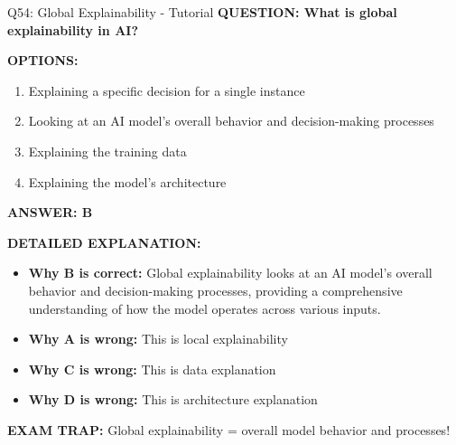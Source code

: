 \documentclass[8pt]{beamer}
\begin{document}
	\begin{frame}{Q54: Global Explainability - Tutorial}
		\fontsize{6.5}{7.5}\selectfont
		\textbf{QUESTION: What is global explainability in AI?}
		
		\vspace{0.1cm}
		\textbf{OPTIONS:}
		\begin{enumerate}
			\item Explaining a specific decision for a single instance
			\item Looking at an AI model's overall behavior and decision-making processes
			\item Explaining the training data
			\item Explaining the model's architecture
		\end{enumerate}
		
		\vspace{0.1cm}
		\textcolor{myblue}{\textbf{ANSWER: B}}
		
		\vspace{0.1cm}
		\textbf{DETAILED EXPLANATION:}
		\begin{itemize}
			\item \textbf{Why B is correct:} Global explainability looks at an AI model's overall behavior and decision-making processes, providing a comprehensive understanding of how the model operates across various inputs.
			\item \textbf{Why A is wrong:} This is local explainability
			\item \textbf{Why C is wrong:} This is data explanation
			\item \textbf{Why D is wrong:} This is architecture explanation
		\end{itemize}
		
		\textcolor{myred}{\textbf{EXAM TRAP:}} Global explainability = \textcolor{myblue}{overall model behavior and processes}!
	\end{frame}
	
\end{document}
